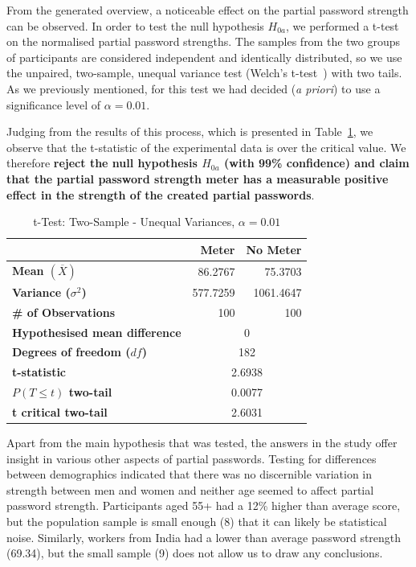     From the generated overview, a noticeable effect on the partial password strength can be observed. In order to test the null hypothesis $H_{0a}$, we performed a t-test on the normalised partial password strengths. The samples from the two groups of participants are considered independent and identically distributed, so we use the unpaired, two-sample, unequal variance test (Welch's t-test~\cite{t_test}) with two tails. As we previously mentioned, for this test we had decided (\emph{a priori}) to use a significance level of $\alpha = 0.01$.

    Judging from the results of this process, which is presented in Table~\ref{tab:t-test}, we observe that the t-statistic of the experimental data is over the critical value. We therefore \textbf{reject the null hypothesis $H_{0a}$ (with 99\% confidence) and claim that the partial password strength meter has a measurable positive effect in the strength of the created partial passwords}.

    \begin{table}[htpb]
      \centering
      \begin{tabular}{l r r}
      \toprule
      & \textbf{Meter} & \textbf{No Meter} \\
      \midrule
      \textbf{Mean $(\overline{X})$} & 86.2767 & 75.3703 \\
      \textbf{Variance ($\sigma^2$)} & 577.7259 & 1061.4647 \\
      \textbf{\# of Observations} & 100 & 100 \\
      \midrule
      \textbf{Hypothesised mean difference} & \multicolumn{2}{c}{0} \\
      \textbf{Degrees of freedom ($df$)} & \multicolumn{2}{c}{182} \\
      \textbf{t-statistic} & \multicolumn{2}{c}{2.6938} \\
      \textbf{$P(T\leq t)$ two-tail} & \multicolumn{2}{c}{0.0077} \\
      \textbf{t critical two-tail} & \multicolumn{2}{c}{2.6031} \\
      \bottomrule
      \end{tabular}
      \caption{t-Test: Two-Sample - Unequal Variances, $\alpha = 0.01$}
      \label{tab:t-test}
    \end{table}

    Apart from the main hypothesis that was tested, the answers in the study offer insight in various other aspects of partial passwords. Testing for differences between demographics indicated that there was no discernible variation in strength between men and women and neither age seemed to affect partial password strength. Participants aged 55+ had a 12\% higher than average score, but the population sample is small enough (8) that it can likely be statistical noise. Similarly, workers from India had a lower than average password strength (69.34), but the small sample (9) does not allow us to draw any conclusions.

